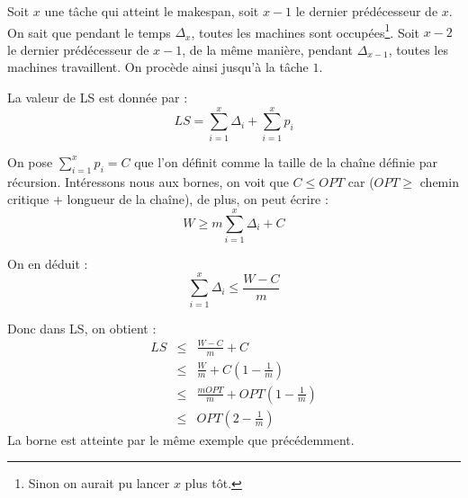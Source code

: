 \documentclass[a4paper, 11pt]{thesis}
\begin{document}
\begin{center}
\end{center}

Soit $x$ une tâche qui atteint le makespan, soit $x - 1$ le dernier prédécesseur de $x$. On sait que
pendant le temps $\Delta_x$, toutes les machines sont occupées\footnote{Sinon on aurait pu lancer
$x$ plus tôt.}. Soit $x-2$ le dernier prédécesseur de $x-1$, de la même manière, pendant
$\Delta_{x-1}$, toutes les machines travaillent. On procède ainsi jusqu'à la tâche $1$.

La valeur de LS est donnée par : \begin{displaymath}
    LS = \sum_{i=1}^x \Delta_i + \sum_{i=1}^x p_i
\end{displaymath}

On pose $\sum_{i=1}^x p_i = C$ que l'on définit comme la taille de la chaîne définie par récursion.
Intéressons nous aux bornes, on voit que $C \leq OPT$ car ($OPT \geq$ chemin critique $+$ longueur de
la chaîne), de plus, on peut écrire : \begin{displaymath}
    W \geq m \sum_{i=1}^x \Delta_i + C
\end{displaymath}

On en déduit : \begin{displaymath}
    \sum_{i=1}^x \Delta_i \leq \frac{W - C}{m}
\end{displaymath}

Donc dans LS, on obtient : \begin{displaymath}
    \begin{array}{rcl}
        LS & \leq & \displaystyle \frac{W - C}{m} + C \\
           & \leq & \displaystyle \frac{W}{m} + C(1 - \frac{1}{m}) \\
           & \leq & \displaystyle \frac{m OPT}{m} + OPT(1 - \frac{1}{m}) \\
           & \leq & \displaystyle OPT(2 - \frac{1}{m})
    \end{array}
\end{displaymath}
La borne est atteinte par le même exemple que précédemment.
\end{document}
